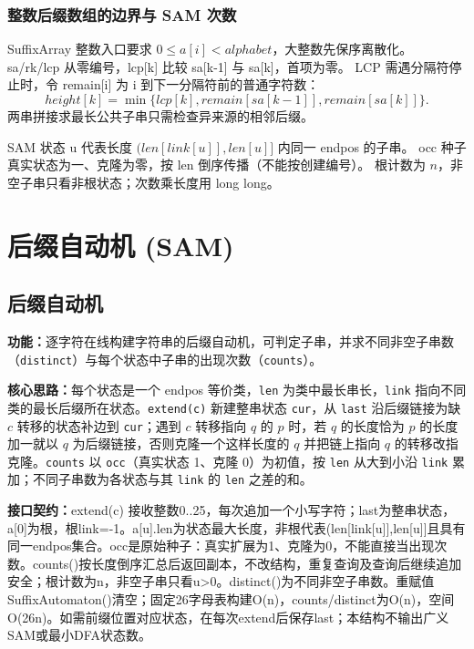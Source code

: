 

\Needspace{253pt}



\subsection{整数后缀数组的边界与 SAM 次数}\label{knowledge-suffix-bounds}
SuffixArray 整数入口要求 $0\le a[i]<alphabet$，大整数先保序离散化。
sa/rk/lcp 从零编号，lcp[k] 比较 sa[k-1] 与 sa[k]，首项为零。
LCP 需遇分隔符停止时，令 remain[i] 为 i 到下一分隔符前的普通字符数：
\[
 height[k]=\min\{lcp[k],remain[sa[k-1]],remain[sa[k]]\}.
\]
两串拼接求最长公共子串只需检查异来源的相邻后缀。

SAM 状态 u 代表长度 $(len[link[u]],len[u]]$ 内同一 endpos 的子串。
occ 种子真实状态为一、克隆为零，按 len 倒序传播（不能按创建编号）。
根计数为 $n$，非空子串只看非根状态；次数乘长度用 long long。


\Needspace{462pt}

\chapter{后缀自动机 (SAM)}

\section{后缀自动机}\label{compact-SuffixAutomaton}

\noindent\textbf{功能：}\allowbreak 逐字符在线构建字符串的后缀自动机，可判定子串，并求不同非空子串数（\texttt{distinct}）与每个状态中子串的出现次数（\texttt{counts}）。

\textbf{核心思路：}\allowbreak 每个状态是一个 endpos 等价类，\texttt{len} 为类中最长串长，\texttt{link} 指向不同类的最长后缀所在状态。\texttt{extend(c)} 新建整串状态 \texttt{cur}，从 \texttt{last} 沿后缀链接为缺 $c$ 转移的状态补边到 \texttt{cur}；遇到 $c$ 转移指向 $q$ 的 $p$ 时，若 $q$ 的长度恰为 $p$ 的长度加一就以 $q$ 为后缀链接，否则克隆一个这样长度的 $q$ 并把链上指向 $q$ 的转移改指克隆。\texttt{counts} 以 \texttt{occ}（真实状态 1、克隆 0）为初值，按 \texttt{len} 从大到小沿 \texttt{link} 累加；不同子串数为各状态与其 \texttt{link} 的 \texttt{len} 之差的和。



{\sloppy{}\noindent\textbf{接口契约：}extend(c) 接收整数0..25，每次追加一个小写字符；last为整串状态，a[0]为根，根link=-1。a[u].len为状态最大长度，非根代表(len[link[u]],len[u]]且具有同一endpos集合。occ是原始种子：真实扩展为1、克隆为0，不能直接当出现次数。counts()按长度倒序汇总后返回副本，不改结构，重复查询及查询后继续追加安全；根计数为n，非空子串只看u>0。distinct()为不同非空子串数。重赋值SuffixAutomaton()清空；固定26字母表构建O(n)，counts/distinct为O(n)，空间O(26n)。如需前缀位置对应状态，在每次extend后保存last；本结构不输出广义SAM或最小DFA状态数。\par}

